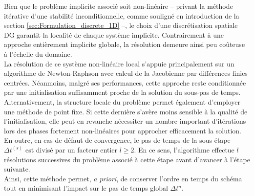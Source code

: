 \documentclass[11pt, a4paper, oneside]{report}
\begin{document}
Bien que le problème implicite associé soit non-linéaire -- privant la méthode itérative d'une stabilité inconditionnelle, comme souligné en introduction de la section \ref{sec:Formulation_discrete_1D} --, le choix d'une discrétisation spatiale DG garantit la localité de chaque système implicite. Contrairement à une approche entièrement implicite globale, la résolution demeure ainsi peu coûteuse à l'échelle du domaine. \\
La résolution de ce système non-linéaire local s'appuie principalement sur un algorithme de Newton-Raphson avec calcul de la Jacobienne par différences finies centrées. Néanmoins, malgré ses performances, cette approche reste conditionnée par une initialisation suffisamment proche de la solution du sous-pas de temps. \\
Alternativement, la structure locale du problème permet également d'employer une méthode de point fixe. Si cette dernière s'avère moins sensible à la qualité de l'initialisation, elle peut en revanche nécessiter un nombre important d'itérations lors des phases fortement non-linéaires pour approcher efficacement la solution. \\
En outre, en cas de défaut de convergence, le pas de temps de la sous-étape $\Delta t^{(s)}$ est divisé par un facteur entier $l \geq 2$. En ce sens, l'algorithme effectue $l$ résolutions successives du problème associé à cette étape avant d'avancer à l'étape suivante. \\
Ainsi, cette méthode permet, \textit{a priori}, de conserver l'ordre en temps du schéma tout en minimisant l'impact sur le pas de temps global $\Delta t^n$. \\
\end{document}
